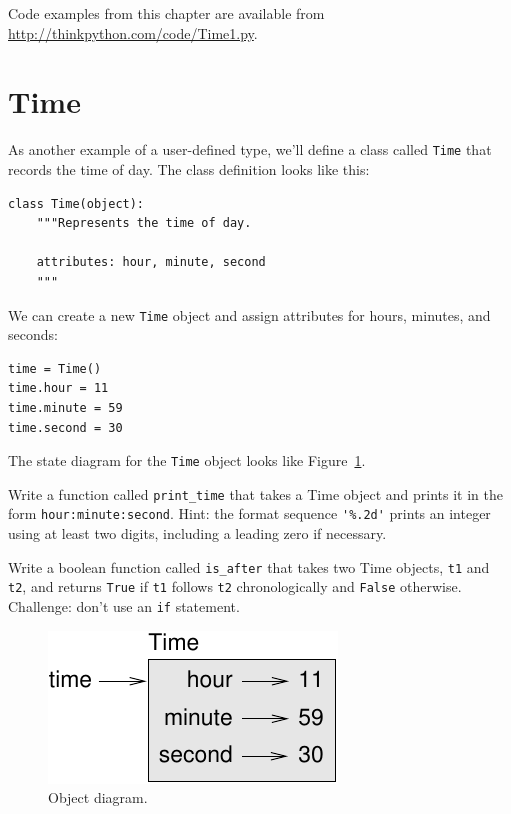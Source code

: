 \documentclass[10pt]{book}
\begin{document}
Code examples from this chapter are available from
\url{http://thinkpython.com/code/Time1.py}.

\section{Time}
\label{time.object}

As another example of a user-defined type, we'll define a class called
{\tt Time} that records the time of day.  The class definition looks
like this:

\begin{verbatim}
class Time(object):
    """Represents the time of day.

    attributes: hour, minute, second
    """
\end{verbatim}
%
We can create a new {\tt Time} object and assign
attributes for hours, minutes, and seconds:

\begin{verbatim}
time = Time()
time.hour = 11
time.minute = 59
time.second = 30
\end{verbatim}
%
The state diagram for the {\tt Time} object looks like Figure~\ref{fig.time}.

\begin{exercise}
\label{ex.printtime}

Write a function called \verb"print_time" that takes a
Time object and prints it in the form {\tt hour:minute:second}.
Hint: the format sequence \verb"'%.2d'" prints an integer using
at least two digits, including a leading zero if necessary.

\end{exercise}

\begin{exercise}
\label{isafter}

Write a boolean function called \verb"is_after" that
takes two Time objects, {\tt t1} and {\tt t2}, and
returns {\tt True} if {\tt t1} follows {\tt t2} chronologically and
{\tt False} otherwise.  Challenge: don't use an {\tt if} statement.
\end{exercise}

\begin{figure}
\centerline
{\includegraphics[scale=0.8]{figs/time.pdf}}
\caption{Object diagram.}
\label{fig.time}
\end{figure}
\end{document}
